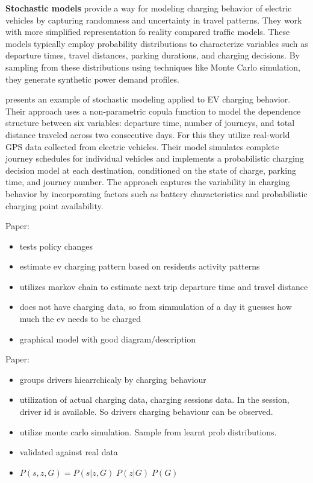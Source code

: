 
\textbf{Stochastic models} provide a way for modeling charging behavior of electric vehicles by capturing randomness and uncertainty in travel patterns. They work with more simplified representation fo reality compared traffic models. These models typically employ probability distributions to characterize variables such as departure times, travel distances, parking durations, and charging decisions. By sampling from these distributions using techniques like Monte Carlo simulation, they generate synthetic power demand profiles.

 presents an example of stochastic modeling applied to EV charging behavior. Their approach uses a non-parametric copula function to model the dependence structure between six variables: departure time, number of journeys, and total distance traveled across two consecutive days. For this they utilize real-world GPS data collected from electric vehicles. Their model simulates complete journey schedules for individual vehicles and implements a probabilistic charging decision model at each destination, conditioned on the state of charge, parking time, and journey number. The approach captures the variability in charging behavior by incorporating factors such as battery characteristics and probabilistic charging point availability.

Paper: 
\begin{itemize}
    \item tests policy changes
    \item estimate ev charging pattern based on residents activity patterns
    \item utilizes markov chain to estimate next trip departure time and travel distance
    \item does not have charging data, so from simmulation of a day it guesses how much the ev needs to be charged
    \item graphical model with good diagram/description
\end{itemize}



Paper: 
\begin{itemize}
    \item groups drivers hiearrchicaly by charging behaviour
    \item utilization of actual charging data, charging sessions data. In the session, driver id is available. So drivers charging behaviour can be observed.
    \item utilize monte carlo simulation. Sample from learnt prob distributions.
    \item validated against real data
    \item $P(s,z,G) = P(s|z,G)\;P(z|G)\;P(G)$
\end{itemize}


